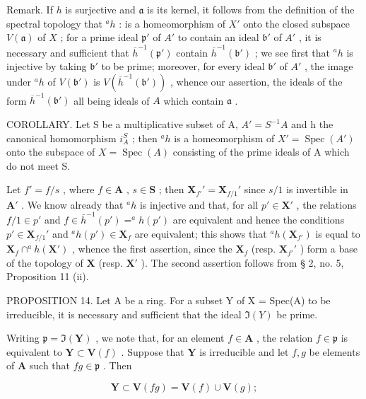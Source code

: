Remark. If \(h\) is surjective and \(\mathfrak{a}\) is its kernel, it follows from the definition of the spectral topology that \(^a h\) : is a homeomorphism of \(X'\) onto the closed subspace \(V(\mathfrak{a})\) of \(X\) ; for a prime ideal \(\mathfrak{p}'\) of \(A'\) to contain an ideal \(\mathfrak{b}'\) of \(A'\) , it is necessary and sufficient that \(\overline{h}^{-1}(\mathfrak{p}')\) contain \(\overline{h}^{-1}(\mathfrak{b}')\) ; we see first that \(^a h\) is injective by taking \(\mathfrak{b}'\) to be prime; moreover, for every ideal \(\mathfrak{b}'\) of \(A'\) , the image under \(^a h\) of \(V(\mathfrak{b}')\) is \(V(\overline{h}^{-1}(\mathfrak{b}'))\) , whence our assertion, the ideals of the form \(\overline{h}^{-1}(\mathfrak{b}')\) all being ideals of \(A\) which contain \(\mathfrak{a}\) .

COROLLARY. Let S be a multiplicative subset of A, \(A' = S^{-1}A\) and h the canonical homomorphism \(i_{A}^{S}\) ; then \(^{a}h\) is a homeomorphism of \(X' = \operatorname{Spec}(A')\) onto the subspace of \(X = \operatorname{Spec}(A)\) consisting of the prime ideals of A which do not meet S.

Let \(f' = f / s\) , where \(f \in \mathbf{A}\) , \(s \in \mathbf{S}\) ; then \(\mathbf{X}_{f'}' = \mathbf{X}_{f/1}'\) since \(s / 1\) is invertible in \(\mathbf{A}'\) . We know already that \(^a h\) is injective and that, for all \(p' \in \mathbf{X}'\) , the relations \(f / 1 \in p'\) and \(f \in \bar{h}^{-1}(p') = ^a h(p')\) are equivalent and hence the conditions \(p' \in \mathbf{X}_{f/1}'\) and \(^a h(p') \in \mathbf{X}_f\) are equivalent; this shows that \(^a h(\mathbf{X}_{f'})\) is equal to \(\mathbf{X}_f \cap ^a h(\mathbf{X}')\) , whence the first assertion, since the \(\mathbf{X}_f\) (resp. \(\mathbf{X}_{f'}'\) ) form a base of the topology of \(\mathbf{X}\) (resp. \(\mathbf{X}'\) ). The second assertion follows from § 2, no. 5, Proposition 11 (ii).

PROPOSITION 14. Let A be a ring. For a subset Y of X = Spec(A) to be irreducible, it is necessary and sufficient that the ideal \(\Im(Y)\) be prime.

Writing \(\mathfrak{p} = \Im(\mathbf{Y})\) , we note that, for an element \(f \in \mathbf{A}\) , the relation \(f \in \mathfrak{p}\) is equivalent to \(\mathbf{Y} \subset \mathbf{V}(f)\) . Suppose that \(\mathbf{Y}\) is irreducible and let \(f, g\) be elements of \(\mathbf{A}\) such that \(fg \in \mathfrak{p}\) . Then

\[
\mathbf {Y} \subset \mathbf {V} (f g) = \mathbf {V} (f) \cup \mathbf {V} (g);
\]

